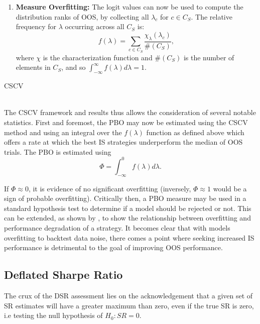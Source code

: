 \documentclass[a4paper,11pt,oneside]{article}
\theoremstyle{plain}
\theoremstyle{definition}
\begin{document}
\begin{algorithm}[H]
\begin{enumerate}
\begin{enumerate}
			\end{enumerate}
			\item \textbf{Measure Overfitting:} The logit values can now be used to compute the distribution ranks of OOS, by collecting all $\lambda_c$ for $c \in C_S$. The relative frequency for $\lambda$ occurring across all $C_S$ is:
			\begin{equation}
			f(\lambda) = \sum_{c \in C_S}\frac{\chi_{\lambda}(\lambda_c)}{\#(C_S)} ,
			\end{equation}
			where $\chi$ is the characterization function and $\#(C_S)$ is the number of elements in $C_S$, and so $\int_{-\infty}^{\infty} f (\lambda) d \lambda = 1$.
		\end{enumerate}
		
		\label{algo_cscv}
		\caption{CSCV}
	\end{algorithm}
	
	
	
	\texttt{\\}
	\newline The CSCV framework and results thus allows the consideration of several notable statistics. First and foremost, 
	the PBO may now be estimated using the CSCV method and using an integral over the $f(\lambda)$ function 
	as defined above which offers a rate at which the best IS strategies underperform the median of OOS trials. The PBO is estimated using
	\begin{equation}
	\Phi = \int_{-\infty}^{0} f (\lambda) d \lambda .
	\end{equation}
	
	
	If $\Phi \approx 0$,
	it is evidence of no significant overfitting (inversely, $\Phi \approx 1$ would be a sign of probable overfitting). Critically then, a PBO measure may be used in a standard hypothesis test to determine if a model should be rejected or not. This 
	can be extended, as shown by \citet{BailyPBO}, to show the relationship between overfitting and performance 
	degradation of a strategy. It becomes clear that with models overfitting to backtest data noise, there comes a point 
	where seeking increased IS performance is detrimental to the goal of improving OOS performance.  
	\hfill \break 
	
	
	\subsection{Deflated Sharpe Ratio}\label{imp_dsr}
	
	The crux of the DSR assessment lies on the acknowledgement that a given set of SR estimates will have a greater maximum than zero, even if the true SR is zero, i.e testing the null hypothesis of $H_0:SR=0$. \newline
	
\end{document}
